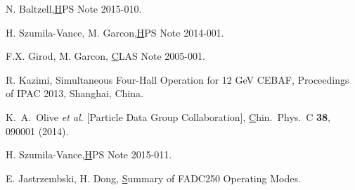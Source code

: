 \documentclass[twoside]{article}
\begin{document}
\begin{multicols}{2}
\begin{thebibliography}{99}
 N. Baltzell,\href{https://confluence.slac.stanford.edu/download/attachments/192191938/3PoleAna.pdf?version=1&modificationDate=1434062944000&api=v2}
HPS Note 2015-010.

 H. Szumila-Vance, M. Garcon,\href{https://misportal.jlab.org/mis/physics/hps_notes/viewFile.cfm/2014-001.pdf?documentId=1}
HPS Note 2014-001.

 F.X. Girod, M. Garcon,
\href{https://misportal.jlab.org/ul/Physics/Hall-B/clas/viewFile.cfm/2005-001.pdf?documentId=6}
CLAS Note 2005-001.

 R. Kazimi, Simultaneous Four-Hall Operation for 12 GeV CEBAF, Proceedings of IPAC 2013, Shanghai, China.

   K.~A.~Olive {\it et al.} [Particle Data Group Collaboration], 
\href{http://pdg.lbl.gov/2009/AtomicNuclearProperties/MUON_ELOSS_TABLES/muonloss_301.ps}
Chin.\ Phys.\ C {\bf 38}, 090001 (2014).

 H. Szumila-Vance,\href{https://misportal.jlab.org/mis/physics/hps_notes/viewFile.cfm/2015-011.pdf?documentId=13}
HPS Note 2015-011.

 E. Jastrzembski, H. Dong,
\href{https://coda.jlab.org/drupal/system/files/pdfs/HardwareManual/fADC250/FADC250%20data%20format%20V23.pdf}
Summary of FADC250 Operating Modes.


\end{thebibliography}


\end{multicols}
\end{document}
